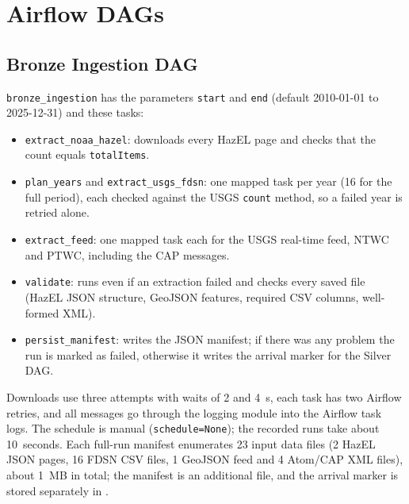 \documentclass[a4paper,11pt,oneside]{book}
\begin{document}
\section{Airflow DAGs}
\subsection{Bronze Ingestion DAG}
\texttt{bronze\_ingestion} has the parameters \texttt{start} and \texttt{end} (default 2010-01-01 to 2025-12-31) and these tasks:
\begin{itemize}[nosep]
  \item \texttt{extract\_noaa\_hazel}: downloads every HazEL page and checks that the count equals \texttt{totalItems}.
  \item \texttt{plan\_years} and \texttt{extract\_usgs\_fdsn}: one mapped task per year (16 for the full period), each checked against the USGS \texttt{count} method, so a failed year is retried alone.
  \item \texttt{extract\_feed}: one mapped task each for the USGS real-time feed, NTWC and PTWC, including the CAP messages.
  \item \texttt{validate}: runs even if an extraction failed and checks every saved file (HazEL JSON structure, GeoJSON features, required CSV columns, well-formed XML).
  \item \texttt{persist\_manifest}: writes the JSON manifest; if there was any problem the run is marked as failed, otherwise it writes the arrival marker for the Silver DAG.
\end{itemize}
Downloads use three attempts with waits of 2 and 4~s, each task has two Airflow retries, and all messages go through the logging module into the Airflow task logs.
The schedule is manual (\texttt{schedule=None}); the recorded runs take about 10~seconds. Each full-run manifest enumerates 23 input data files (2 HazEL JSON pages, 16 FDSN CSV files, 1 GeoJSON feed and 4 Atom/CAP XML files), about 1~MB in total; the manifest is an additional file, and the arrival marker is stored separately in .
\end{document}

